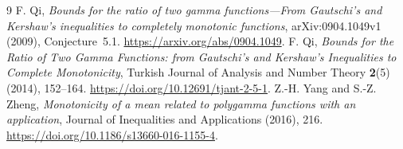 \documentclass[11pt]{article}
\begin{document}
\begin{thebibliography}{9}
 F. Qi,
\emph{Bounds for the ratio of two gamma functions---From Gautschi's and
Kershaw's inequalities to completely monotonic functions},
arXiv:0904.1049v1 (2009), Conjecture~5.1.
\url{https://arxiv.org/abs/0904.1049}.
 F. Qi,
\emph{Bounds for the Ratio of Two Gamma Functions: from Gautschi's and
Kershaw's Inequalities to Complete Monotonicity},
Turkish Journal of Analysis and Number Theory \textbf{2}(5) (2014),
152--164. \url{https://doi.org/10.12691/tjant-2-5-1}.
 Z.-H. Yang and S.-Z. Zheng,
\emph{Monotonicity of a mean related to polygamma functions with an
application}, Journal of Inequalities and Applications (2016), 216.
\url{https://doi.org/10.1186/s13660-016-1155-4}.
\end{thebibliography}
\end{document}
